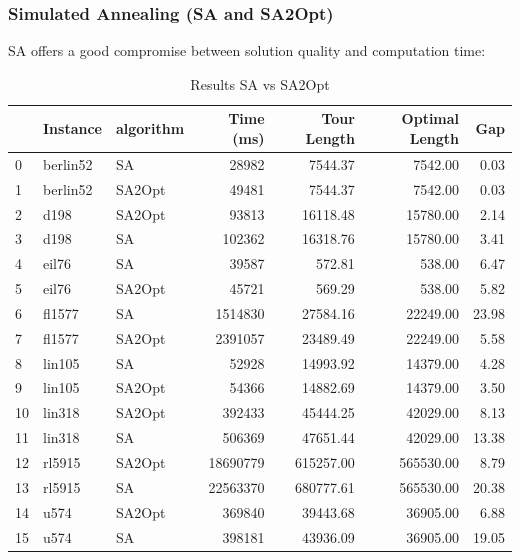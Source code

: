 \subsubsection{Simulated Annealing (SA and SA2Opt)}
SA offers a good compromise between solution quality and computation time:


\begin{table}[H]
	\centering
	\caption{Results SA vs SA2Opt}
	\begin{tabular}{lllrrrr}
		\toprule
		   & Instance & algorithm & Time (ms) & Tour Length & Optimal Length & Gap   \\
		\midrule
		0  & berlin52 & SA        & 28982      & 7544.37        & 7542.00          & 0.03  \\
		1  & berlin52 & SA2Opt    & 49481      & 7544.37        & 7542.00          & 0.03  \\
		2  & d198     & SA2Opt    & 93813      & 16118.48       & 15780.00         & 2.14  \\
		3  & d198     & SA        & 102362     & 16318.76       & 15780.00         & 3.41  \\
		4  & eil76    & SA        & 39587      & 572.81         & 538.00           & 6.47  \\
		5  & eil76    & SA2Opt    & 45721      & 569.29         & 538.00           & 5.82  \\
		6  & fl1577   & SA        & 1514830    & 27584.16       & 22249.00         & 23.98 \\
		7  & fl1577   & SA2Opt    & 2391057    & 23489.49       & 22249.00         & 5.58  \\
		8  & lin105   & SA        & 52928      & 14993.92       & 14379.00         & 4.28  \\
		9  & lin105   & SA2Opt    & 54366      & 14882.69       & 14379.00         & 3.50  \\
		10 & lin318   & SA2Opt    & 392433     & 45444.25       & 42029.00         & 8.13  \\
		11 & lin318   & SA        & 506369     & 47651.44       & 42029.00         & 13.38 \\
		12 & rl5915   & SA2Opt    & 18690779   & 615257.00      & 565530.00        & 8.79  \\
		13 & rl5915   & SA        & 22563370   & 680777.61      & 565530.00        & 20.38 \\
		14 & u574     & SA2Opt    & 369840     & 39443.68       & 36905.00         & 6.88  \\
		15 & u574     & SA        & 398181     & 43936.09       & 36905.00         & 19.05 \\
		\bottomrule
	\end{tabular}
\end{table}


